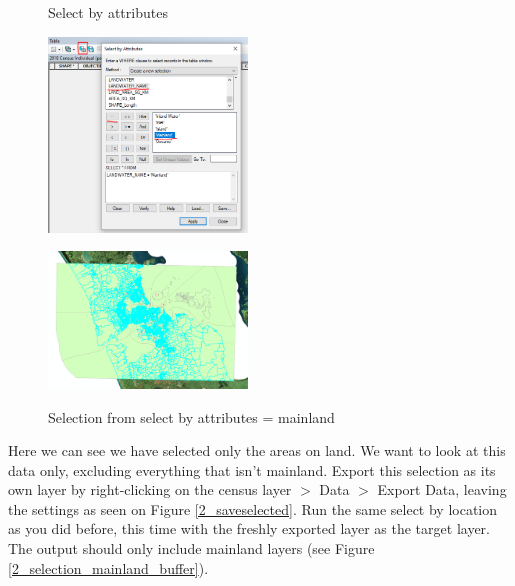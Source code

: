 \documentclass{article}
\begin{document}
\begin{figure}[h]
  \centering
  \begin{minipage}[b]{0.4\textwidth}
    \centering
    \caption{Select by attributes}
    \includegraphics[width=200px]{images/part2/selectbyattributes.PNG}
    \label{2_selectbyattributes}
  \end{minipage}
  \hfill
  \begin{minipage}[b]{0.4\textwidth}
    \centering
    \caption{Selection from select by attributes = mainland}
    \includegraphics[width=200px]{images/part2/selection_mainland.PNG}
    \label{2_selection_mainland}
  \end{minipage}
\end{figure}

Here we can see we have selected only the areas on land. We want to look at this data only, excluding everything that isn't mainland. Export this selection as its own layer by right-clicking on the census layer $>$ Data $>$ Export Data, leaving the settings as seen on Figure \ref{2_saveselected}. Run the same select by location as you did before, this time with the freshly exported layer as the target layer. The output should only include mainland layers (see Figure \ref{2_selection_mainland_buffer}).
\end{document}
